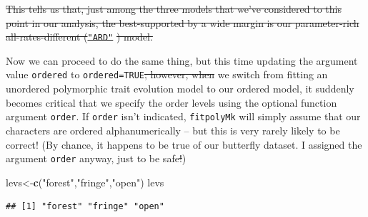 \documentclass[fleqn,10pt,lineno]{wlpeerj}
\newenvironment{Shaded}{\begin{snugshade}}{\end{snugshade}}
\newcommand{\FunctionTok}[1]{\textcolor[rgb]{0.13,0.29,0.53}{\textbf{#1}}}
\newcommand{\NormalTok}[1]{#1}
\newcommand{\OtherTok}[1]{\textcolor[rgb]{0.56,0.35,0.01}{#1}}
\newcommand{\StringTok}[1]{\textcolor[rgb]{0.31,0.60,0.02}{#1}}
\providecommand{\DIFaddtex}[1]{{\protect\color{blue}\uwave{#1}}} %
\providecommand{\DIFdeltex}[1]{{\protect\color{red}\sout{#1}}}                      %
\providecommand{\DIFaddbegin}{} %
\providecommand{\DIFaddend}{} %
\providecommand{\DIFdelbegin}{} %
\providecommand{\DIFdelend}{} %
\providecommand{\DIFmodbegin}{} %
\providecommand{\DIFmodend}{} %
\providecommand{\DIFadd}[1]{\texorpdfstring{\DIFaddtex{#1}}{#1}} %
\providecommand{\DIFdel}[1]{\texorpdfstring{\DIFdeltex{#1}}{}} %
\newcommand{\DIFscaledelfig}{0.5}
\newlength{\DIFdelgraphicswidth} %
\newlength{\DIFdelgraphicsheight} %
\newcommand{\DIFaddincludegraphics}[2][]{{\color{blue}\fbox{\DIFOincludegraphics[#1]{#2}}}} %
\newcommand{\DIFdelincludegraphics}[2][]{%
\sbox{\DIFdelgraphicsbox}{\DIFOincludegraphics[#1]{#2}}%
\settoboxwidth{\DIFdelgraphicswidth}{\DIFdelgraphicsbox} %
\settoboxtotalheight{\DIFdelgraphicsheight}{\DIFdelgraphicsbox} %
\scalebox{\DIFscaledelfig}{%
\parbox[b]{\DIFdelgraphicswidth}{\usebox{\DIFdelgraphicsbox}\\[-\baselineskip] \rule{\DIFdelgraphicswidth}{0em}}\llap{\resizebox{\DIFdelgraphicswidth}{\DIFdelgraphicsheight}{%
\setlength{\unitlength}{\DIFdelgraphicswidth}%
\begin{picture}(1,1)%
\thicklines\linethickness{2pt} %
{\color[rgb]{1,0,0}\put(0,0){\framebox(1,1){}}}%
{\color[rgb]{1,0,0}\put(0,0){\line( 1,1){1}}}%
{\color[rgb]{1,0,0}\put(0,1){\line(1,-1){1}}}%
\end{picture}%
}\hspace*{3pt}}} %
} %
\DeclareRobustCommand{\DIFaddbegin}{\DIFOaddbegin \let\includegraphics\DIFaddincludegraphics} %
\DeclareRobustCommand{\DIFaddend}{\DIFOaddend \let\includegraphics\DIFOincludegraphics} %
\DeclareRobustCommand{\DIFdelbegin}{\DIFOdelbegin \let\includegraphics\DIFdelincludegraphics} %
\DeclareRobustCommand{\DIFdelend}{\DIFOaddend \let\includegraphics\DIFOincludegraphics} %
\begin{document}
\DIFmodbegin
\begin{DIFverbatim}[alsolanguage=DIFcode]
\end{DIFverbatim}
\DIFmodend %

\DIFdel{This tells us that, just among the three models that we've considered to
this point in our analysis, the best-supported by a wide margin is our
parameter-rich all-rates-different (}\texttt{\DIFdel{"ARD"}}%
\DIFdel{) model.
}%

\DIFdelend Now we can proceed to do the same thing, but this time updating the
argument value \texttt{ordered} to \texttt{ordered=TRUE}\DIFdelbegin \DIFdel{; however, when
}\DIFdelend \DIFaddbegin \DIFadd{. When }\DIFaddend we switch
from fitting an unordered polymorphic trait evolution model to our
ordered model, it suddenly becomes critical that we specify the order
levels using the optional function argument \texttt{order}. If
\texttt{order} isn't indicated, \texttt{fitpolyMk} will simply assume
that our characters are ordered alphanumerically -- but this is very
rarely likely to be correct! (By chance, it happens to be true of our
butterfly dataset. I assigned the argument \texttt{order} anyway, just
to be safe\DIFdelbegin \DIFdel{!}\DIFdelend \DIFaddbegin \DIFadd{.}\DIFaddend )

\begin{Shaded}
\begin{Highlighting}[]
\NormalTok{levs}\OtherTok{\textless{}{-}}\FunctionTok{c}\NormalTok{(}\StringTok{"forest"}\NormalTok{,}\StringTok{"fringe"}\NormalTok{,}\StringTok{"open"}\NormalTok{)}
\NormalTok{levs}
\end{Highlighting}
\end{Shaded}

\begin{verbatim}
## [1] "forest" "fringe" "open"
\end{verbatim}
\end{document}
